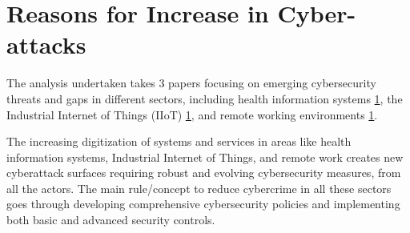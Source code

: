 \documentclass[journal]{IEEEtran}
\begin{document}
%




\section{Reasons for Increase in Cyber-attacks}

The analysis undertaken takes 3 papers focusing on emerging cybersecurity threats and gaps in different sectors, including health information systems \ref{}, the Industrial Internet of Things (IIoT) \ref{}, and remote working environments \ref{}.

The increasing digitization of systems and services in areas like health information systems, Industrial Internet of Things, and remote work creates new cyberattack surfaces requiring robust and evolving cybersecurity measures, from all the actors. The main rule/concept to reduce cybercrime in all these sectors goes through  developing comprehensive cybersecurity policies and implementing both basic and advanced security controls.
\end{document}
